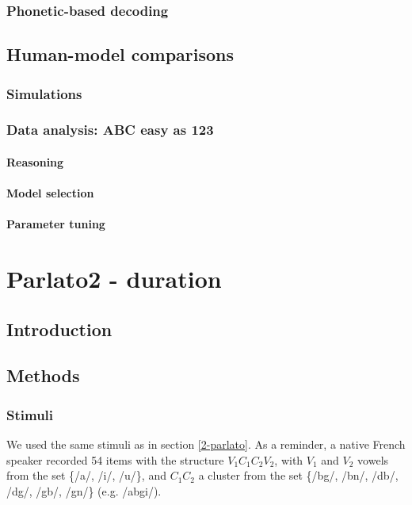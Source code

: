 \subsubsection{Phonetic-based decoding}

\subsection{Human-model comparisons} \label{3-methods_comparison}
\subsubsection{Simulations}
\subsubsection{Data analysis: ABC easy as 123} \label{3-methods_comparison_ABC}
\paragraph{Reasoning}
\paragraph{Model selection}
\paragraph{Parameter tuning}


\section{{\color{red}Parlato2 - duration}} \label{3-parlato2}
\subsection{Introduction}
\subsection{Methods}
\subsubsection{Stimuli}
We used the same stimuli as in section \ref{2-parlato}. As a reminder, a native French speaker recorded 54 items with the structure $V_{1}C_{1}C_{2}V_{2}$, with $V_{1}$ and $V_{2}$ vowels from the set \{/a/, /i/, /u/\}, and $C_{1}C_{2}$ a cluster from the set \{/bg/, /bn/, /db/, /dg/, /gb/, /gn/\} (e.g. /abgi/).

